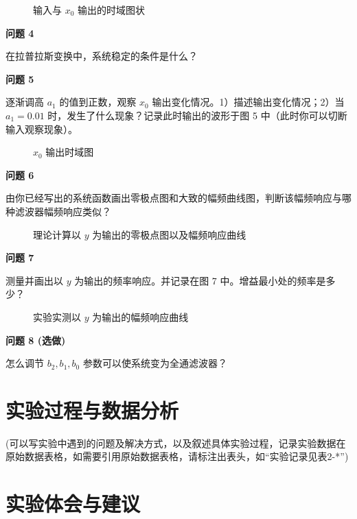 \documentclass{sasreport}
\begin{document}
\begin{figure}[H]
    \caption{输入与 $x_0$ 输出的时域图状}
    \centering

\end{figure}

\textbf{问题 4}

在拉普拉斯变换中，系统稳定的条件是什么？

\textbf{问题 5}

逐渐调高 $a_1$ 的值到正数，观察 $x_0$ 输出变化情况。1）描述输出变化情况；2）当 $a_1=0.01$ 时，发生了什么现象？记录此时输出的波形于图 5 中（此时你可以切断输入观察现象）。

\begin{figure}[H]
    \caption{$x_0$ 输出时域图}
    \centering

\end{figure}

\textbf{问题 6}

由你已经写出的系统函数画出零极点图和大致的幅频曲线图，判断该幅频响应与哪种滤波器幅频响应类似？

\begin{figure}[H]
    \caption{理论计算以 $y$ 为输出的零极点图以及幅频响应曲线}
    \centering

\end{figure}

\textbf{问题 7}

测量并画出以 $y$ 为输出的频率响应。并记录在图 7 中。增益最小处的频率是多少？

\begin{figure}[H]
    \caption{实验实测以 $y$ 为输出的幅频响应曲线}
    \centering

\end{figure}

\textbf{问题 8 (选做)}

怎么调节 $b_2,b_1,b_0$ 参数可以使系统变为全通滤波器？

\section{实验过程与数据分析}
 {\kaishu (可以写实验中遇到的问题及解决方式，以及叙述具体实验过程，记录实验数据在原始数据表格，如需要引用原始数据表格，请标注出表头，如“实验记录见表2-*”)}

\section{实验体会与建议}
\end{document}
